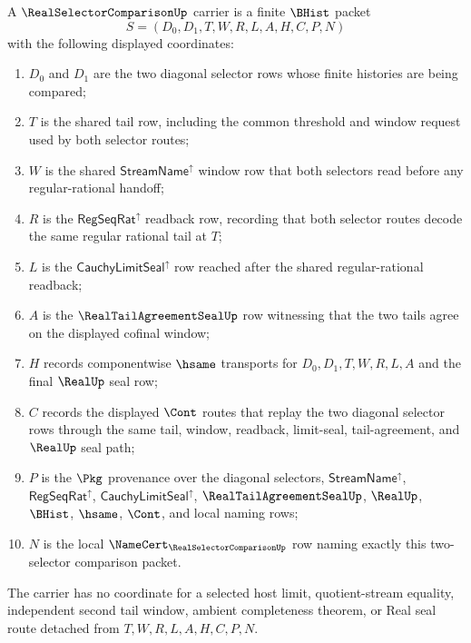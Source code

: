 \begin{definition}
\label{def:real-selector-comparison-carrier}
A $\RealSelectorComparisonUp$ carrier is a finite $\BHist$ packet
$$
S=(D_0,D_1,T,W,R,L,A,H,C,P,N)
$$
with the following displayed coordinates:
\begin{enumerate}
\item $D_0$ and $D_1$ are the two diagonal selector rows whose finite histories are being compared;
\item $T$ is the shared tail row, including the common threshold and window request used by both selector routes;
\item $W$ is the shared $\mathsf{StreamName}^{\uparrow}$ window row that both selectors read before any regular-rational handoff;
\item $R$ is the $\mathsf{RegSeqRat}^{\uparrow}$ readback row, recording that both selector routes decode the same regular rational tail at $T$;
\item $L$ is the $\mathsf{CauchyLimitSeal}^{\uparrow}$ row reached after the shared regular-rational readback;
\item $A$ is the $\RealTailAgreementSealUp$ row witnessing that the two tails agree on the displayed cofinal window;
\item $H$ records componentwise $\hsame$ transports for $D_0,D_1,T,W,R,L,A$ and the final $\RealUp$ seal row;
\item $C$ records the displayed $\Cont$ routes that replay the two diagonal selector rows through the same tail, window, readback, limit-seal, tail-agreement, and $\RealUp$ seal path;
\item $P$ is the $\Pkg$ provenance over the diagonal selectors, $\mathsf{StreamName}^{\uparrow}$, $\mathsf{RegSeqRat}^{\uparrow}$, $\mathsf{CauchyLimitSeal}^{\uparrow}$, $\RealTailAgreementSealUp$, $\RealUp$, $\BHist$, $\hsame$, $\Cont$, and local naming rows;
\item $N$ is the local $\NameCert_{\RealSelectorComparisonUp}$ row naming exactly this two-selector comparison packet.
\end{enumerate}
The carrier has no coordinate for a selected host limit, quotient-stream equality, independent second tail window, ambient completeness theorem, or Real seal route detached from $T,W,R,L,A,H,C,P,N$.
\end{definition}

